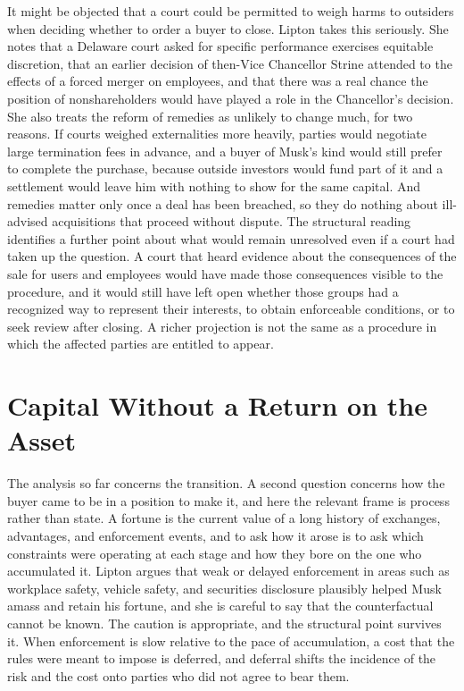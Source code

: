 \documentclass[11pt]{article}
\theoremstyle{definition}
\begin{document}
It might be objected that a court could be permitted to weigh harms to outsiders when deciding whether to order a buyer to close. Lipton takes this seriously. She notes that a Delaware court asked for specific performance exercises equitable discretion, that an earlier decision of then-Vice Chancellor Strine attended to the effects of a forced merger on employees, and that there was a real chance the position of nonshareholders would have played a role in the Chancellor's decision. She also treats the reform of remedies as unlikely to change much, for two reasons. If courts weighed externalities more heavily, parties would negotiate large termination fees in advance, and a buyer of Musk's kind would still prefer to complete the purchase, because outside investors would fund part of it and a settlement would leave him with nothing to show for the same capital. And remedies matter only once a deal has been breached, so they do nothing about ill-advised acquisitions that proceed without dispute. The structural reading identifies a further point about what would remain unresolved even if a court had taken up the question. A court that heard evidence about the consequences of the sale for users and employees would have made those consequences visible to the procedure, and it would still have left open whether those groups had a recognized way to represent their interests, to obtain enforceable conditions, or to seek review after closing. A richer projection is not the same as a procedure in which the affected parties are entitled to appear.

\section{Capital Without a Return on the Asset}

The analysis so far concerns the transition. A second question concerns how the buyer came to be in a position to make it, and here the relevant frame is process rather than state. A fortune is the current value of a long history of exchanges, advantages, and enforcement events, and to ask how it arose is to ask which constraints were operating at each stage and how they bore on the one who accumulated it. Lipton argues that weak or delayed enforcement in areas such as workplace safety, vehicle safety, and securities disclosure plausibly helped Musk amass and retain his fortune, and she is careful to say that the counterfactual cannot be known. The caution is appropriate, and the structural point survives it. When enforcement is slow relative to the pace of accumulation, a cost that the rules were meant to impose is deferred, and deferral shifts the incidence of the risk and the cost onto parties who did not agree to bear them.
\end{document}
